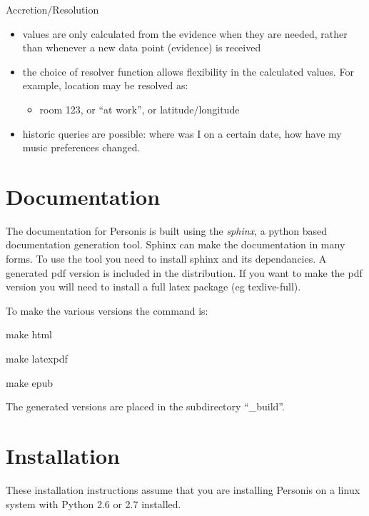 \documentclass[letterpaper,10pt,english]{sphinxmanual}
\begin{document}
Accretion/Resolution
\begin{itemize}
\item {} 
values are only calculated from the evidence when they are needed, rather than whenever a new data point (evidence) is received

\item {} 
the choice of resolver function allows flexibility in the calculated values. For example, location may be resolved as:
\begin{itemize}
\item {} 
room 123, or ``at work'', or latitude/longitude

\end{itemize}

\item {} 
historic queries are possible: where was I on a certain date, how have my music preferences changed.

\end{itemize}


\chapter{Documentation}
\label{Documentation:documentation}\label{Documentation::doc}
The documentation for Personis is built using the \emph{sphinx}, a python based documentation generation tool.
Sphinx can make the documentation in many forms.
To use the tool you need to install sphinx and its dependancies.
A generated pdf version is included in the distribution.
If you want to make the pdf version you will need to install a full latex package (eg texlive-full).

To make the various versions the command is:

\begin{DUlineblock}{0em}
\item[] make html
\item[] make latexpdf
\item[] make epub
\end{DUlineblock}

The generated versions are placed in the subdirectory ``\_build''.


\chapter{Installation}
\label{Installation:installation}\label{Installation::doc}
These installation instructions assume that you are installing Personis on a linux system with Python 2.6 or 2.7
installed.
\end{document}
